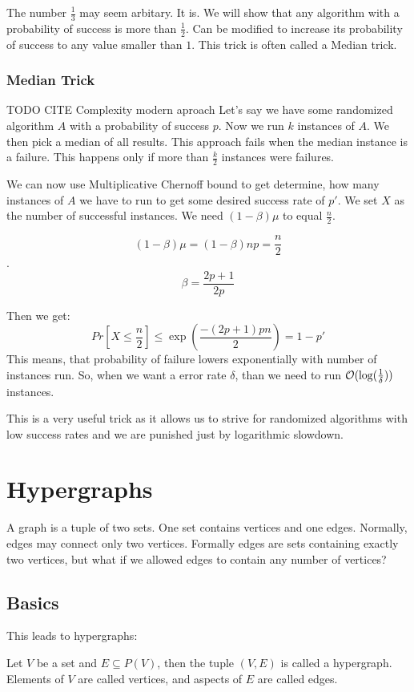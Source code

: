 The number $\frac{1}{3}$ may seem arbitary. It is. We will show that any algorithm with a probability of success is more than $\frac{1}{2}$. Can be modified to increase its probability of success to any value smaller than $1$. This trick is often called a Median trick. 

\subsubsection{Median Trick}

TODO CITE Complexity modern aproach
Let's say we have some randomized algorithm $A$ with a probability of success $p$. Now we run $k$ instances of $A$. We then pick a median of all results. This approach fails when the median instance is a failure. This happens only if more than $\frac{k}{2}$ instances were failures. 

We can now use Multiplicative Chernoff bound to get determine, how many instances of $A$ we have to run to get some desired success rate of $p'$. We set $X$ as the number of successful instances. We need $(1-\beta)\mu$ to equal $\frac{n}{2}$. 

$$(1-\beta)\mu = (1-\beta)np = \frac{n}{2}$$. 
$$\beta = \frac{2p + 1}{2p}$$


Then we get: $$Pr[X \leq \frac{n}{2}] \leq \exp \left( \frac{-(2p+1)pn}{2} \right) = 1 - p'$$
This means, that probability of failure lowers exponentially with number of instances run. So, when we want a error rate $\delta$, than we need to run $\mathcal{O}(\log(\frac{1}{\delta}))$ instances.

This is a very useful trick as it allows us to strive for randomized algorithms with low success rates and we are punished just by logarithmic slowdown.

\section{Hypergraphs}
A graph is a tuple of two sets. One set contains vertices and one edges. Normally, edges may connect only two vertices. Formally edges are sets containing exactly two vertices, but what if we allowed edges to contain any number of vertices? 
\subsection{Basics}
This leads to hypergraphs:

\begin{defn}
    Let \(V\) be a set and \(E \subseteq P(V)\), then the tuple \((V, E)\) is called a hypergraph. Elements of \(V\) are called vertices, and aspects of \(E\) are called edges.
\end{defn}

